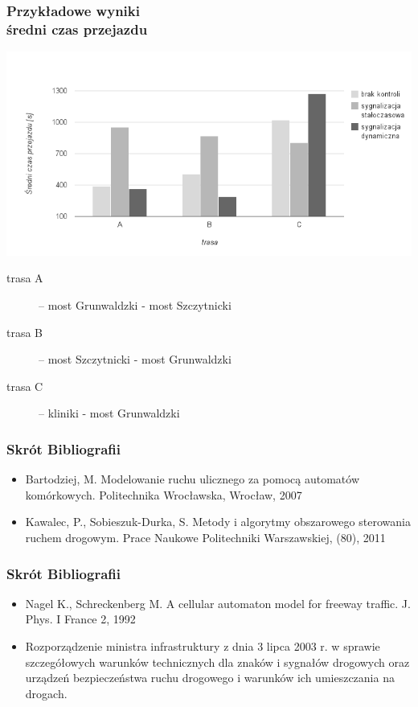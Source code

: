 \documentclass[17pt]{beamer}
\begin{document}
\begin{frame}[shrink=5]
  \frametitle{\vspace{10px}Przykładowe wyniki\\\small{średni czas przejazdu}}
  \includegraphics[width=1.0\textwidth]{wyniki_3.png}\\
  \tiny{
  \begin{description}
  \item[trasa A] -- most Grunwaldzki - most Szczytnicki
  \item[trasa B] -- most Szczytnicki - most Grunwaldzki
  \item[trasa C] -- kliniki - most Grunwaldzki
  \end{description}
  }
\end{frame}

\begin{frame}[shrink=5]
 \frametitle{\vspace{22px}Skrót Bibliografii}
 {\small
 \begin{itemize}
  \item{Bartodziej, M. Modelowanie ruchu ulicznego za pomocą automatów komórkowych. Politechnika Wrocławska, Wrocław, 2007}
  \item{Kawalec, P., Sobieszuk-Durka, S. Metody i algorytmy obszarowego sterowania ruchem drogowym. Prace Naukowe Politechniki Warszawskiej, (80), 2011}
 \end{itemize}
 }
\end{frame}

\begin{frame}[shrink=5]
 \frametitle{\vspace{22px}Skrót Bibliografii}
 {\small
 \begin{itemize}
  \item{Nagel K., Schreckenberg M. A cellular automaton model for freeway traffic. J. Phys. I France 2, 1992}
  \item{Rozporządzenie ministra infrastruktury z dnia 3 lipca 2003 r. w sprawie szczegółowych warunków technicznych
 dla znaków i sygnałów drogowych oraz urządzeń bezpieczeństwa ruchu drogowego i warunków ich umieszczania na drogach.}
 \end{itemize}
 }
\end{frame}
\end{document}
